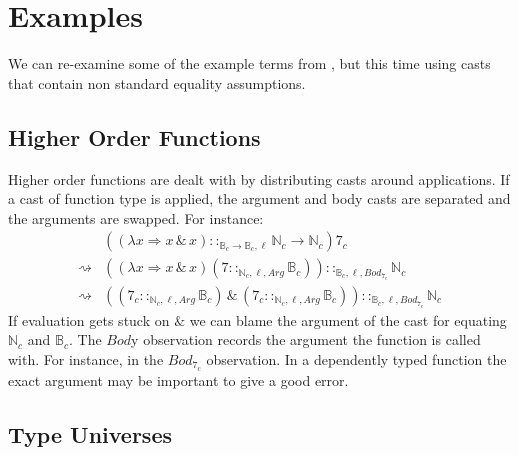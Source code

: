 \section{Examples}
We can re-examine some of the example terms from , but this time using casts that contain non standard equality assumptions.
 
\subsection{Higher Order Functions}
 
Higher order functions are dealt with by distributing casts around applications.
If a cast of function type is applied, the argument and body casts are separated and the arguments are swapped.
For instance:
\begin{align*}
\, & \left(\left(\lambda x\Rightarrow x\,\&\,x\right)::_{\mathbb{B}_c \rightarrow\mathbb{B}_c , \ell}\mathbb{N}_c \rightarrow\mathbb{N}_c \right) 7_c\\
\rightsquigarrow & \left(\left(\lambda x\Rightarrow x\,\&\,x\right)\left(7::_{\mathbb{N}_c , \ell, Arg}\mathbb{B}_c \right)\right)::_{\mathbb{B}_c , \ell, Bod_{7_c}}\mathbb{N}_c \\
\rightsquigarrow & \left(\left(7_c ::_{\mathbb{N}_c , \ell, Arg}\mathbb{B}_c \right)\,\&\,\left(7_c ::_{\mathbb{N}_c , \ell, Arg}\mathbb{B}_c \right)\right) ::_{\mathbb{B}_c , \ell, Bod_{7_c}}\mathbb{N}_c 
\end{align*}
If evaluation gets stuck on $\&$ we can blame the argument of the cast for equating $\mathbb{N}_c$ and $\mathbb{B}_c$.
The $Bod$y observation records the argument the function is called with.
For instance, in the $Bod_{7_c}$ observation.
In a dependently typed function the exact argument may be important to give a good error.

\subsection{Type Universes}
 

